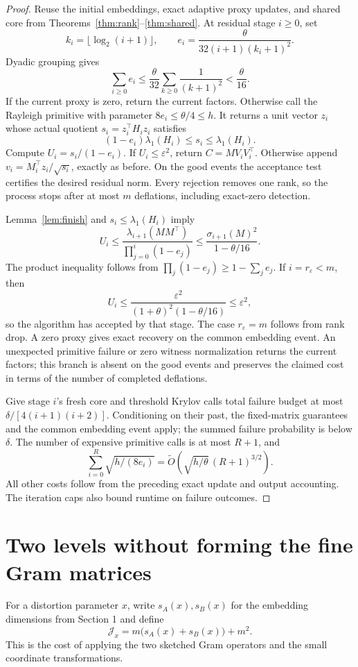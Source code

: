\documentclass[11pt]{article}
\begin{document}
\begin{proof}
Reuse the initial embeddings, exact adaptive proxy updates, and shared
core from Theorems~\ref{thm:rank}--\ref{thm:shared}.
At residual stage \(i\geq0\), set
\[
 k_i=\lfloor\log_2(i+1)\rfloor,\qquad
 e_i=\frac{\theta}{32(i+1)(k_i+1)^2}.
\]
Dyadic grouping gives
\[
 \sum_{i\geq0}e_i
 \leq\frac{\theta}{32}\sum_{k\geq0}\frac1{(k+1)^2}
 <\frac{\theta}{16}.
\]
If the current proxy is zero, return the current factors. Otherwise call
the Rayleigh primitive with parameter \(8e_i\leq\theta/4\leq h\).
It returns a unit vector \(z_i\) whose actual quotient
\(s_i=z_i^\top H_i z_i\) satisfies
\[
 (1-e_i)\lambda_1(H_i)\leq s_i\leq\lambda_1(H_i).
\]
Compute \(U_i=s_i/(1-e_i)\). If \(U_i\leq\varepsilon^2\),
return \(C=MV_iV_i^\top\). Otherwise append
\(v_i=M_i^\top z_i/\sqrt{s_i}\), exactly as before. On the good
events the acceptance test certifies the desired residual norm. Every
rejection removes one rank, so the process stops after at most \(m\)
deflations, including exact-zero detection.

Lemma~\ref{lem:finish} and \(s_i\leq\lambda_1(H_i)\) imply
\[
 U_i\leq
 \frac{\lambda_{i+1}(MM^\top)}{\prod_{j=0}^{i}(1-e_j)}
 \leq\frac{\sigma_{i+1}(M)^2}{1-\theta/16}.
\]
The product inequality follows from
\(\prod_j(1-e_j)\geq1-\sum_j e_j\). If
\(i=r_\varepsilon<m\), then
\[
 U_i\leq
 \frac{\varepsilon^2}{(1+\theta)^2(1-\theta/16)}
 \leq\varepsilon^2,
\]
so the algorithm has accepted by that stage. The case
\(r_\varepsilon=m\) follows from rank drop. A zero proxy gives exact
recovery on the common embedding event.
An unexpected primitive failure or zero witness normalization returns the
current factors; this branch is absent on the good events and preserves
the claimed cost in terms of the number of completed deflations.

Give stage \(i\)'s fresh core and threshold Krylov calls total failure
budget at most \(\delta/[4(i+1)(i+2)]\). Conditioning on their past,
the fixed-matrix guarantees and the common embedding event apply;
the summed failure probability is below \(\delta\).
The number of expensive primitive calls is at most \(R+1\), and
\[
 \sum_{i=0}^{R}\sqrt{h/(8e_i)}
 =\widetilde O\!\left(\sqrt{h/\theta}\,(R+1)^{3/2}\right).
\]
All other costs follow from the preceding exact update and output
accounting. The iteration caps also bound runtime on failure outcomes.
\end{proof}

\section{Two levels without forming the fine Gram matrices}
For a distortion parameter \(x\), write \(s_A(x),s_B(x)\) for the
embedding dimensions from Section 1 and define
\[
 \mathcal J_x=m\bigl(s_A(x)+s_B(x)\bigr)+m^2.
\]
This is the cost of applying the two sketched Gram operators and the
small coordinate transformations.
\end{document}
